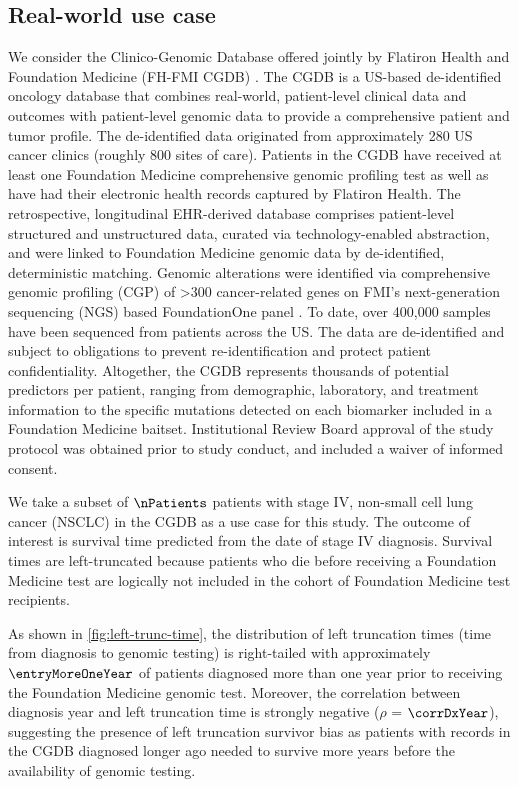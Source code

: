 \documentclass[11pt,final,fleqn]{article}\usepackage[]{graphicx}\usepackage[]{color}
\theoremstyle{plain}
\begin{document}
\subsection{Real-world use case}
We consider the Clinico-Genomic Database offered jointly by Flatiron Health and Foundation Medicine (FH-FMI CGDB) \cite{singal2017cgdb}. The CGDB is a US-based de-identified oncology database that combines real-world, patient-level clinical data and outcomes with patient-level genomic data to provide a comprehensive patient and tumor profile. The de-identified data originated from approximately 280 US cancer clinics (roughly 800 sites of care). Patients in the CGDB have received at least one Foundation Medicine comprehensive genomic profiling test as well as have had their electronic health records captured by Flatiron Health. The retrospective, longitudinal EHR-derived database comprises patient-level structured and unstructured data, curated via technology-enabled abstraction, and were linked to Foundation Medicine genomic data by de-identified, deterministic matching. Genomic alterations were identified via comprehensive genomic profiling (CGP) of >300 cancer-related genes on FMI's next-generation sequencing (NGS) based FoundationOne panel \cite{birnbaum2020modelassisted, ma2020fmi}. To date, over 400,000 samples have been sequenced from patients across the US. The data are de-identified and subject to obligations to prevent re-identification and protect patient confidentiality. Altogether, the CGDB represents thousands of potential predictors per patient, ranging from demographic, laboratory, and treatment information to the specific mutations detected on each biomarker included in a Foundation Medicine baitset. Institutional Review Board approval of the study protocol was obtained prior to study conduct, and included a waiver of informed consent.

We take a subset of $\nPatients$ patients with stage IV, non-small cell lung cancer (NSCLC) in the CGDB as a use case for this study. The outcome of interest is survival time predicted from the date of stage IV diagnosis. Survival times are left-truncated because patients who die before receiving a Foundation Medicine test are logically not included in the cohort of Foundation Medicine test recipients. 

As shown in \autoref{fig:left-trunc-time}, the distribution of left truncation times (time from diagnosis to genomic testing) is right-tailed with approximately $\entryMoreOneYear$ of patients diagnosed more than one year prior to receiving the Foundation Medicine genomic test.  Moreover, the correlation between diagnosis year and left truncation time is strongly negative ({$\rho$} = $\corrDxYear$), suggesting the presence of left truncation survivor bias as patients with records in the CGDB diagnosed longer ago needed to survive more years before the availability of genomic testing. 
\end{document}
